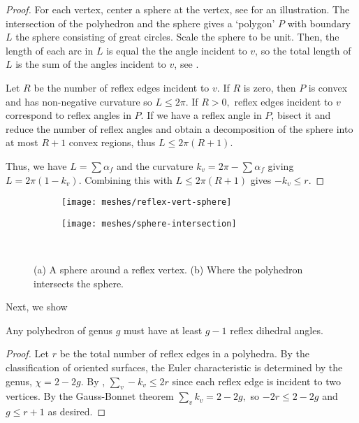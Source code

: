 \begin{proof}

For each vertex, center a sphere at the vertex,
see  \label{fig:sphere-on-vert} for an illustration.
The intersection of the polyhedron and the sphere
gives a `polygon' $P$ with boundary $L$ the sphere consisting of great
circles. 
Scale the sphere to be unit. Then, the length of each arc
in $L$ is equal the the angle incident to $v$, so the total length of $L$ is
the sum of the angles incident to $v$, see .

Let $R$ be the number of reflex edges incident to $v$.
If $R$ is zero, then $P$ is convex and has non-negative curvature
so $L\leq 2\pi$. If $R>0,$
reflex edges incident to $v$ correspond to reflex angles in $P$.
If we have a reflex angle in $P$, bisect it and reduce the 
number of reflex angles and obtain a decomposition
of the sphere into at most $R+1$ convex regions,
thus $L\leq 2\pi(R+1)$.

Thus, we have $L=\sum \alpha_f$ and the curvature 
$k_v=2\pi-\sum \alpha_f$ giving
$L=2\pi(1-k_v)$. Combining this with $L\leq 2\pi(R+1)$
gives $-k_v\leq r.$


\end{proof}

\begin{figure}[htb]
        \centering
        \begin{subfigure}[b]{0.35\textwidth}
        \texttt{[image: meshes/reflex-vert-sphere]}
        \caption{}
          \label{fig:sphere-on-vert}
        \end{subfigure}
          \hspace{.0cm}
         \begin{subfigure}[b]{0.45\textwidth}
        \texttt{[image: meshes/sphere-intersection]}
        \caption{}
        \label{fig:sphere}
        \end{subfigure}\\
		\caption{(a) A sphere around a reflex vertex. (b) Where the polyhedron
		intersects the sphere.
		\label{fig:sphere}}
\end{figure}


Next, we show
\begin{theorem}\label{thm:reflex}

Any polyhedron of genus $g$ must have 
at least $g-1$ reflex dihedral angles. 

\end{theorem}
\begin{proof}
Let $r$ be the total number of reflex edges in a polyhedra.
By the classification of oriented surfaces, the Euler characteristic 
 is determined by the genus, $\chi=2-2g$.
By , $\sum_v -k_v\leq 2 r$ since each
reflex edge is incident to two vertices.
By the Gauss-Bonnet theorem $\sum_vk_v= 2-2g,$
so $-2r\leq 2-2g$ and $g\leq r+1$ as desired.

\end{proof}

